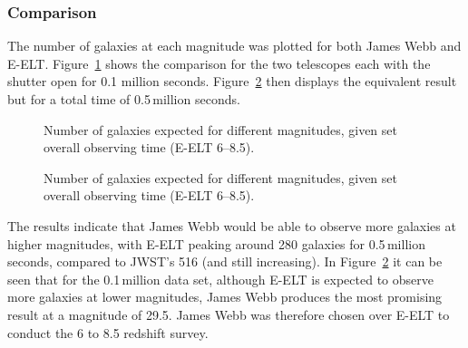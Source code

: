 	\subsubsection{Comparison} %
	\label{sub:comparison}
		The number of galaxies at each magnitude was plotted for both James Webb and E-ELT. Figure~\ref{fig:GRAPH_Mag_vs_galaxies_JWST_ELT_05} shows the comparison for the two telescopes each with the shutter open for 0.1 million seconds. Figure~\ref{fig:GRAPH_Mag_vs_galaxies_JWST_ELT_10} then displays the equivalent result but for a total time of 0.5\,million seconds.
		\begin{figure}[htbp]
			\centering
				\begingroup{}
					\resizebox{0.8\textwidth}{!}{%
						
					}\endgroup
			\caption{Number of galaxies expected for different magnitudes, given set overall observing time (E-ELT 6--8.5).\label{fig:GRAPH_Mag_vs_galaxies_JWST_ELT_05}}
		\end{figure}
		\begin{figure}[htbp]
			\centering
				\begingroup{}
					\resizebox{0.8\textwidth}{!}{%
						
					}\endgroup
			\caption{Number of galaxies expected for different magnitudes, given set overall observing time (E-ELT 6--8.5).\label{fig:GRAPH_Mag_vs_galaxies_JWST_ELT_10}}
		\end{figure}

		The results indicate that James Webb would be able to observe more galaxies at higher magnitudes, with E-ELT peaking around 280 galaxies for 0.5\,million seconds, compared to JWST's 516 (and still increasing). In Figure~\ref{fig:GRAPH_Mag_vs_galaxies_JWST_ELT_10} it can be seen that for the 0.1\,million data set, although E-ELT is expected to observe more galaxies at lower magnitudes, James Webb produces the most promising result at a magnitude of 29.5. James Webb was therefore chosen over E-ELT to conduct the 6 to 8.5 redshift survey.

